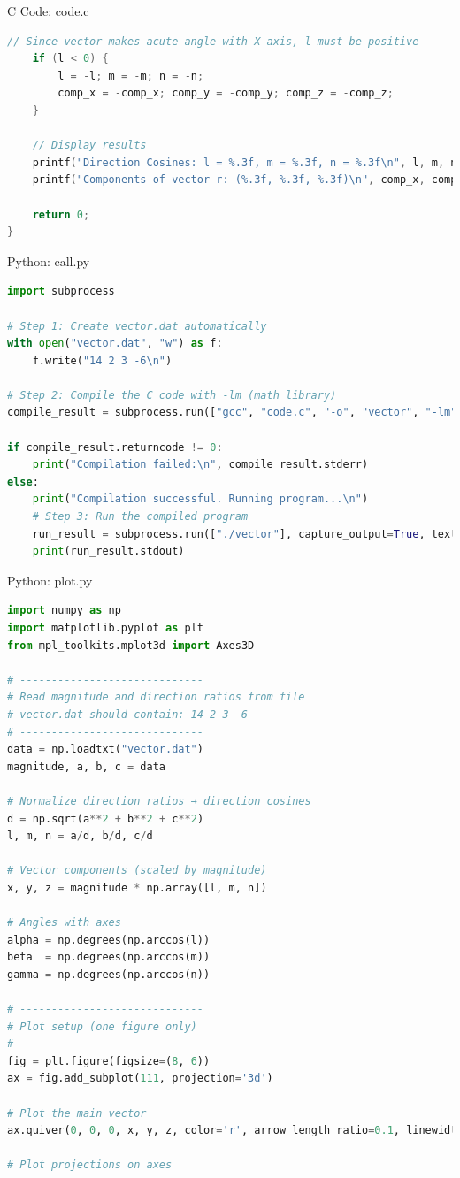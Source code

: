 \documentclass{beamer}
\numberwithin{equation}{section}
\theoremstyle{remark}
\begin{document}
\begin{frame}[fragile]{C Code: code.c}
\begin{lstlisting}[language=C]
    // Since vector makes acute angle with X-axis, l must be positive
    if (l < 0) {
        l = -l; m = -m; n = -n;
        comp_x = -comp_x; comp_y = -comp_y; comp_z = -comp_z;
    }

    // Display results
    printf("Direction Cosines: l = %.3f, m = %.3f, n = %.3f\n", l, m, n);
    printf("Components of vector r: (%.3f, %.3f, %.3f)\n", comp_x, comp_y, comp_z);

    return 0;
}
\end{lstlisting}
\end{frame}

\begin{frame}[fragile]{Python: call.py}
\begin{lstlisting}[language=Python]
import subprocess

# Step 1: Create vector.dat automatically
with open("vector.dat", "w") as f:
    f.write("14 2 3 -6\n")

# Step 2: Compile the C code with -lm (math library)
compile_result = subprocess.run(["gcc", "code.c", "-o", "vector", "-lm"], capture_output=True, text=True)

if compile_result.returncode != 0:
    print("Compilation failed:\n", compile_result.stderr)
else:
    print("Compilation successful. Running program...\n")
    # Step 3: Run the compiled program
    run_result = subprocess.run(["./vector"], capture_output=True, text=True)
    print(run_result.stdout)
\end{lstlisting}
\end{frame}

\begin{frame}[fragile]{Python: plot.py}
\begin{lstlisting}[language=Python]
import numpy as np
import matplotlib.pyplot as plt
from mpl_toolkits.mplot3d import Axes3D

# -----------------------------
# Read magnitude and direction ratios from file
# vector.dat should contain: 14 2 3 -6
# -----------------------------
data = np.loadtxt("vector.dat")
magnitude, a, b, c = data

# Normalize direction ratios → direction cosines
d = np.sqrt(a**2 + b**2 + c**2)
l, m, n = a/d, b/d, c/d

# Vector components (scaled by magnitude)
x, y, z = magnitude * np.array([l, m, n])

# Angles with axes
alpha = np.degrees(np.arccos(l))
beta  = np.degrees(np.arccos(m))
gamma = np.degrees(np.arccos(n))

# -----------------------------
# Plot setup (one figure only)
# -----------------------------
fig = plt.figure(figsize=(8, 6))
ax = fig.add_subplot(111, projection='3d')

# Plot the main vector
ax.quiver(0, 0, 0, x, y, z, color='r', arrow_length_ratio=0.1, linewidth=2, label="Vector r")

# Plot projections on axes
\end{lstlisting}
\end{frame}
\end{document}
